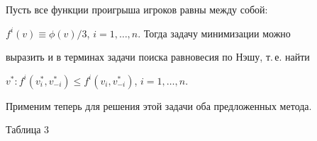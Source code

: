 \smallskip 


 


Пусть все функции проигрыша игроков равны между собой: 


$f^i(v)\equiv\phi(v)/3$, $i=1,\dotsc,n$. Тогда задачу минимизации можно 


выразить и в терминах задачи поиска равновесия по Нэшу, т.\,е. найти 


$v^*:f^i(v^*_i,v^*_{-i})\le f^i(v_i,v^*_{-i})$, $i=1,\dotsc,n$. 


Применим теперь для решения этой задачи оба предложенных метода. 


\smallskip 


 


{\hfill Таблица 3} 


\smallskip 


